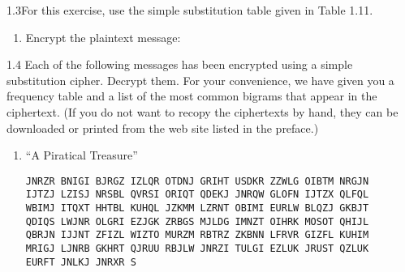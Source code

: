 \begin{exercise}
    {1.3}For this exercise, use the simple substitution table given in Table 1.11.
    \begin{enumerate}
        \item Encrypt the plaintext message:
    \end{enumerate}
\end{exercise}


\begin{exercise}
    {1.4} Each of the following messages has been encrypted using a simple substitution cipher. Decrypt them. For your convenience, we have given you a frequency table and a list of the most common bigrams that appear in the ciphertext. (If you do not want to recopy the ciphertexts by hand, they can be downloaded or printed from the web site listed in the preface.)
    \begin{enumerate}
        \item “A Piratical Treasure”
        \begin{flushleft}
            \texttt{JNRZR BNIGI BJRGZ IZLQR OTDNJ GRIHT USDKR ZZWLG OIBTM NRGJN} \\
            \texttt{IJTZJ LZISJ NRSBL QVRSI ORIQT QDEKJ JNRQW GLOFN IJTZX QLFQL} \\
            \texttt{WBIMJ ITQXT HHTBL KUHQL JZKMM LZRNT OBIMI EURLW BLQZJ GKBJT} \\
            \texttt{QDIQS LWJNR OLGRI EZJGK ZRBGS MJLDG IMNZT OIHRK MOSOT QHIJL} \\ 
            \texttt{QBRJN IJJNT ZFIZL WIZTO MURZM RBTRZ ZKBNN LFRVR GIZFL KUHIM} \\ 
            \texttt{MRIGJ LJNRB GKHRT QJRUU RBJLW JNRZI TULGI EZLUK JRUST QZLUK} \\ 
            \texttt{EURFT JNLKJ JNRXR S}
        \end{flushleft}
    \end{enumerate}
\end{exercise}


